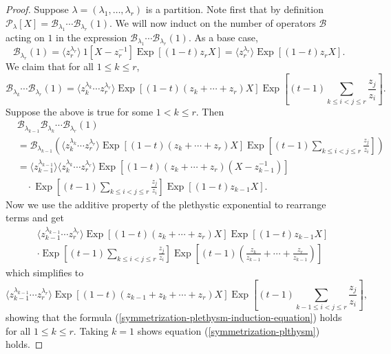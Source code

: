 \documentclass[ALCO,Unicode]{cedram}
\DeclareMathOperator{\EXP}{\mathrm{Exp}}
\begin{document}
\begin{proof}
Suppose $\lambda = (\lambda_1,\ldots, \lambda_r)$ is a partition.    
Note first that by definition $ \mathcal{P}_{\lambda}[X] = \mathscr{B}_{\lambda_1}\cdots \mathscr{B}_{\lambda_r}(1).$ We will now induct on the number of operators $\mathscr{B}$ acting on $1$ in the expression $\mathscr{B}_{\lambda_1}\cdots \mathscr{B}_{\lambda_r}(1).$ As a base case,  
\[\mathscr{B}_{\lambda_r}(1) = \langle z_r ^{\lambda_r} \rangle ~1[X-z_{r}^{-1}]\EXP[(1-t)z_rX] = \langle z_r ^{\lambda_r} \rangle \EXP[(1-t)z_rX].\]
We claim that for all $1\leq k \leq r$,
\begin{equation} \label{symmetrization-plethysm-induction-equation}
    \mathscr{B}_{\lambda_k}\cdots \mathscr{B}_{\lambda_r}(1) = \langle z_{k}^{\lambda_{k}} \cdots z_r^{\lambda_r} \rangle \EXP[(1-t)(z_k+\cdots +z_r)X]\EXP\left[(t-1)\sum_{k\leq i<j\leq r}\frac{z_j}{z_i}\right].
\end{equation}
Suppose the above is true for some $1< k \leq r$. Then 
\begin{align*}
    &\mathscr{B}_{\lambda_{k-1}}\mathscr{B}_{\lambda_k}\cdots \mathscr{B}_{\lambda_r}(1)  \\
    &= \mathscr{B}_{\lambda_{k-1}} \left( \langle z_{k}^{\lambda_{k}} \cdots z_r^{\lambda_r} \rangle \EXP[(1-t)(z_k+\cdots +z_r)X]\EXP\left[(t-1)\sum_{k\leq i<j\leq r}\frac{z_j}{z_i}\right] \right) \\
   &=  \langle z_{k-1}^{\lambda_{k-1}} \rangle  \langle z_{k}^{\lambda_{k}} \cdots z_r^{\lambda_r} \rangle \EXP[(1-t)(z_k+\cdots +z_r)(X-z_{k-1}^{-1})] \\ &\quad  \cdot \EXP\left[(t-1)\sum_{k\leq i<j\leq r}\frac{z_j}{z_i}\right] \EXP[(1-t)z_{k-1}X].
\end{align*}
Now we use the additive property of the plethystic exponential to rearrange terms and get
\begin{equation*}
\begin{split}
    &\langle z_{k-1}^{\lambda_{k-1}} \cdots z_r^{\lambda_r} \rangle \EXP\left[(1-t)(z_k+\cdots +z_r)X\right] \EXP[(1-t)z_{k-1}X] \\
    &\cdot \EXP\left[(t-1)\sum_{k\leq i<j\leq r}\frac{z_j}{z_i}\right]\EXP\left[(t-1)\left(\frac{z_k}{z_{k-1}}+\cdots +\frac{z_r}{z_{k-1}}\right)\right]
\end{split}
\end{equation*}
    which simplifies to 
$$ \langle z_{k-1}^{\lambda_{k-1}} \cdots z_r^{\lambda_r} \rangle \EXP[(1-t)(z_{k-1}+z_k+\cdots +z_r)X] \EXP\left[(t-1)\sum_{k-1\leq i<j\leq r}\frac{z_j}{z_i}\right],$$ showing that the formula (\ref{symmetrization-plethysm-induction-equation}) holds for all $1\leq k\leq r$. Taking $k=1$ shows equation (\ref{symmetrization-plthysm}) holds.
\end{proof}
\end{document}
